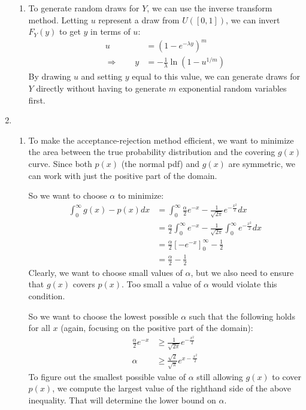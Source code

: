 \documentclass[12pt]{article}
\theoremstyle{plain}
\theoremstyle{definition}
\theoremstyle{remark}
\begin{document}
\begin{enumerate}
\begin{enumerate}
      \item %
        To generate random draws for $Y$, we can use the inverse
        transform method. Letting $u$ represent a draw from $U([0,1])$,
        we can invert $F_Y(y)$ to get $y$ in terms of $u$:
        \begin{align*}
          u &= \left( 1-e^{-\lambda y} \right)^m\\
          \Rightarrow \qquad
          y &= -\frac{1}{\lambda}\ln\left(1-u^{1/m}\right)
        \end{align*}
        By drawing $u$ and setting $y$ equal to this value, we can
        generate draws for $Y$ directly without having to generate $m$
        exponential random variables first.
    \end{enumerate}

  \item %
    \begin{enumerate}
      \item %
        To make the acceptance-rejection method efficient, we want to
        minimize the area between the true probability distribution and
        the covering $g(x)$ curve. Since both $p(x)$ (the normal pdf)
        and $g(x)$ are symmetric, we can work with just the positive
        part of the domain.

        So we want to choose $\alpha$ to minimize:
        \begin{align*}
          \int^\infty_0 g(x) - p(x) dx
          &= \int^\infty_0 \frac{\alpha}{2} e^{-x}
            - \frac{1}{\sqrt{2\pi}} e^{-\frac{x^2}{2}}dx\\
          &= \frac{\alpha}{2} \int^\infty_0 e^{-x}
            - \frac{1}{\sqrt{2\pi}}\int^\infty_0 e^{-\frac{x^2}{2}}dx \\
          &= \frac{\alpha}{2} \left[-e^{-x}\right]^\infty_0 -\frac{1}{2}\\
          &= \frac{\alpha}{2} -\frac{1}{2}
        \end{align*}
        Clearly, we want to choose small values of $\alpha$, but we also
        need to ensure that $g(x)$ covers $p(x)$. Too small a value of
        $\alpha$ would violate this condition.

        So we want to choose the lowest possible $\alpha$ such that the
        following holds for all $x$ (again, focusing on the positive
        part of the domain):
        \begin{align*}
          \frac{\alpha}{2} e^{-x} &\geq
            \frac{1}{\sqrt{2\pi}} e^{-\frac{x^2}{2}}\\
          \alpha &\geq
            \frac{\sqrt{2}}{\sqrt{\pi}} e^{x-\frac{x^2}{2}}
        \end{align*}
        To figure out the smallest possible value of $\alpha$ still
        allowing $g(x)$ to cover $p(x)$, we compute the largest value of
        the righthand side of the above inequality. That will determine
        the lower bound on $\alpha$.


\end{enumerate}
\end{enumerate}
\end{document}
